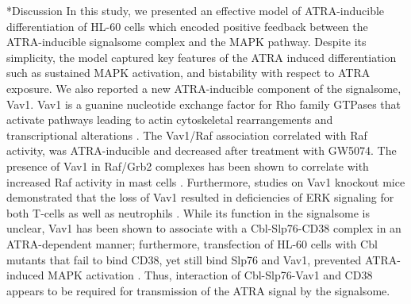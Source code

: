 \documentclass[12pt]{article}
\makeatletter
\renewcommand\section{\@startsection
	{subsection}{2}{0mm}
	{-0.2in}
	{0.05\baselineskip}
	{\normalfont\large\bfseries}}
\makeatother
\begin{document}
\clearpage

\section*{Discussion}
In this study, we presented an effective model of ATRA-inducible differentiation of HL-60 cells which
encoded positive feedback between the ATRA-inducible signalsome complex and the MAPK pathway.
Despite its simplicity, the model captured key features of the ATRA induced differentiation such as
sustained MAPK activation, and bistability with respect to ATRA exposure. We also reported a new ATRA-inducible component of the signalsome, Vav1.
Vav1 is a guanine nucleotide exchange factor for Rho family GTPases that activate pathways leading to actin cytoskeletal rearrangements and transcriptional alterations \cite{Hornstein:2004aa}.
The Vav1/Raf association correlated with Raf activity, was ATRA-inducible and decreased after treatment with GW5074.
The presence of Vav1 in Raf/Grb2 complexes has been shown to correlate with increased Raf activity in mast cells \cite{Song1996}.
Furthermore, studies on Vav1 knockout mice demonstrated that the loss of Vav1 resulted in deficiencies
of ERK signaling for both T-cells as well as neutrophils \cite{Costello1999,Graham2007}.
While its function in the signalsome is unclear, Vav1 has been shown to associate with a Cbl-Slp76-CD38 complex in an ATRA-dependent manner;
furthermore, transfection of HL-60 cells with Cbl mutants that fail to bind CD38, yet still bind Slp76 and Vav1, prevented
ATRA-induced MAPK activation \cite{Shen2009}. Thus, interaction of Cbl-Slp76-Vav1 and CD38 appears to be required for transmission of the ATRA signal by the
signalsome.
\end{document}
